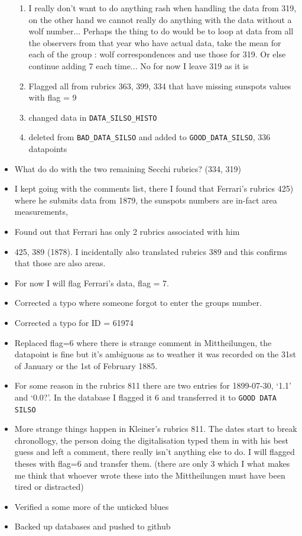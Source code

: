 \documentclass[12pt]{article}
\begin{document}
\begin{itemize}
\begin{enumerate}
        \item I really don't want to do anything rash when handling the data from 319, on the other hand we cannot really do anything with the data without a wolf number... Perhaps the thing to do would be to loop at data from all the observers from that year who have actual data, take the mean for each of the group : wolf correspondences and use those for 319. Or else continue adding 7 each time... No for now I leave 319 as it is
        \item Flagged all from rubrics 363, 399, 334 that have missing sunspots values with flag = 9
        \item changed data in \texttt{DATA\_SILSO\_HISTO}
        \item deleted from \texttt{BAD\_DATA\_SILSO} and added to \texttt{GOOD\_DATA\_SILSO}, 336 datapoints
    \end{enumerate}
    \item What do do with the two remaining Secchi rubrics? (334, 319)
    \item I kept going with the comments list, there I found that Ferrari's rubrics 425) where he submits data from 1879, the sunspots numbers are in-fact area measurements, 
    \item Found out that Ferrari has only 2 rubrics associated with him
    \item 425, 389 (1878). I incidentally also translated rubrics 389 and this confirms that those are also areas. 
    \item For now I will flag Ferrari's data, flag = 7. 
    \item Corrected a typo where someone forgot to enter the groups number.
    \item Corrected a typo for ID = 61974
    \item Replaced flag=6 where there is strange comment in Mittheilungen, the datapoint is fine but it's ambiguous as to weather it was recorded on the 31st of January or the 1st of February 1885.
    \item For some reason in the rubrics 811 there are two entries for 1899-07-30, `1.1' and `0.0?'. In the database I flagged it 6 and transferred it to \texttt{GOOD DATA SILSO}
    \item More strange things happen in Kleiner's rubrics 811. The dates start to break chronollogy, the person doing the digitalisation typed them in with his best guess and left a comment, there really isn't anything else to do. I will flagged theses with flag=6 and transfer them. (there are only 3 which I what makes me think that whoever wrote these into the Mittheilungen must have been tired or distracted)
    \item Verified a some more of the unticked blues
    \item Backed up databases and pushed to github
\end{itemize}
\end{document}
